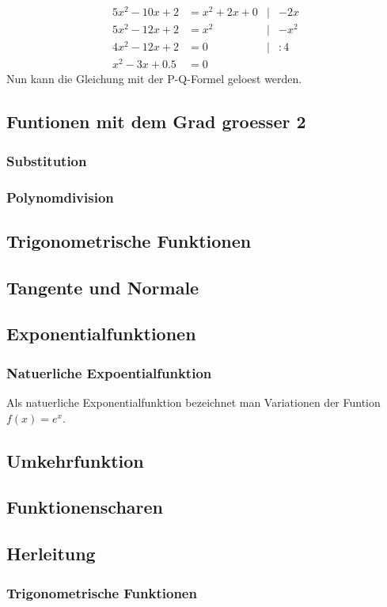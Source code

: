 \documentclass[a4paper]{article} %
\begin{document}
		\begin{align*}
			5x^2-10x+2 &= x^2+2x+0 & 	|&-2x\\
			5x^2-12x+2 &= x^2 & 		|&-x^2\\
			4x^2-12x+2 &= 0   & 		|&:4\\
			x^2-3x+0.5 &= 0 	
		\end{align*}
			Nun kann die Gleichung mit der P-Q-Formel geloest werden.
		\newpage
		\subsection{Funtionen mit dem Grad groesser 2}
		\subsubsection{Substitution}
		\subsubsection{Polynomdivision}
		\subsection{Trigonometrische Funktionen}
		\subsection{Tangente und Normale}
		\subsection{Exponentialfunktionen}
		\subsubsection{Natuerliche Expoentialfunktion}
		Als natuerliche Exponentialfunktion bezeichnet man Variationen der Funtion $f(x)=e^x$.
		\subsection{Umkehrfunktion}
		\subsection{Funktionenscharen}
		\subsection{Herleitung}
		\subsubsection{Trigonometrische Funktionen}
\end{document}
